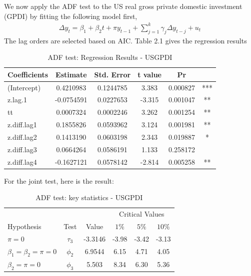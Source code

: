 \documentclass[12pt]{article}
\theoremstyle{definition}
\numberwithin{equation}{section}
\numberwithin{figure}{section}
\numberwithin{table}{section}
\begin{document}
We now apply the ADF test to the US real gross private domestic investment (GPDI) by fitting the following model first,
\begin{align*}
  \Delta y_t = \beta_1 + \beta_2 t + \pi y_{t-1} + \sum_{j=1}^k \gamma_j \Delta y_{t-j} + u_t
\end{align*}
The lag orders are selected based on AIC. Table 2.1 gives the regression results
\begin{table}[H]
  \renewcommand{\arraystretch}{1.2}
  \centering
  \caption{ADF test: Regression Results - USGPDI}
\begin{tabular}{lccccc}
  \hline
Coefficients & Estimate & Std. Error & t value & Pr \\
\hline
(Intercept)  & 0.4210983 & 0.1244785 &  3.383 & 0.000827 &***   \\
z.lag.1    & -0.0754591&  0.0227653 & -3.315 &0.001047 &**  \\
tt         &  0.0007324 & 0.0002246  & 3.262& 0.001254& **   \\
z.diff.lag1 & 0.1855826 & 0.0593962  & 3.124& 0.001981& **  \\
z.diff.lag2 & 0.1413190 & 0.0603198 &  2.343& 0.019887 & *   \\
z.diff.lag3  & 0.0664264 &  0.0586191 & 1.133 & 0.258172   \\
z.diff.lag4 & -0.1627121&  0.0578142 & -2.814 & 0.005258 & ** \\
\hline
\end{tabular}
\end{table}
For the joint test, here is the result:
\begin{table}[H]
  \renewcommand{\arraystretch}{1.2}
  \centering
  \caption{ADF test: key statistics - USGPDI}
  \begin{tabular}{lccccc}
    \hline
    \hline
    & & &  \multicolumn{3}{c}{Critical Values} \\
    \cline{4-6}
    Hypothesis & Test &  Value & $1\%$ & $5\%$ & $10\%$ \\
    $\pi = 0$ & $\tau_3$ & -3.3146 & -3.98 & -3.42 & -3.13 \\
    $\beta_1 = \beta_2 = \pi = 0$ & $\phi_2$ & 6.9544  & 6.15 & 4.71 & 4.05 \\
    $\beta_2 = \pi = 0$ & $\phi_3$ & 5.503  & 8.34 &  6.30 &  5.36 \\
    \hline
  \end{tabular}
\end{table}





















\newpage


\end{document}
